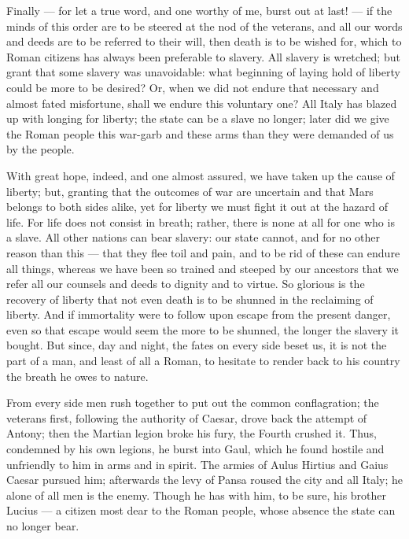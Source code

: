  Finally --- for let a true word, and one worthy of me, burst out at last! --- if the minds of this order are to be steered at the nod of the veterans, and all our words and deeds are to be referred to their will, then death is to be wished for, which to Roman citizens has always been preferable to slavery. All slavery is wretched; but grant that some slavery was unavoidable: what beginning of laying hold of liberty could be more to be desired? Or, when we did not endure that necessary and almost fated misfortune, shall we endure this voluntary one? All Italy has blazed up with longing for liberty; the state can be a slave no longer; later did we give the Roman people this war-garb and these arms than they were demanded of us by the people.

 With great hope, indeed, and one almost assured, we have taken up the cause of liberty; but, granting that the outcomes of war are uncertain and that Mars belongs to both sides alike, yet for liberty we must fight it out at the hazard of life. For life does not consist in breath; rather, there is none at all for one who is a slave. All other nations can bear slavery: our state cannot, and for no other reason than this --- that they flee toil and pain, and to be rid of these can endure all things, whereas we have been so trained and steeped by our ancestors that we refer all our counsels and deeds to dignity and to virtue. So glorious is the recovery of liberty that not even death is to be shunned in the reclaiming of liberty. And if immortality were to follow upon escape from the present danger, even so that escape would seem the more to be shunned, the longer the slavery it bought. But since, day and night, the fates on every side beset us, it is not the part of a man, and least of all a Roman, to hesitate to render back to his country the breath he owes to nature.

 From every side men rush together to put out the common conflagration; the veterans first, following the authority of Caesar, drove back the attempt of Antony; then the Martian legion broke his fury, the Fourth crushed it. Thus, condemned by his own legions, he burst into Gaul, which he found hostile and unfriendly to him in arms and in spirit. The armies of Aulus Hirtius and Gaius Caesar pursued him; afterwards the levy of Pansa roused the city and all Italy; he alone of all men is the enemy. Though he has with him, to be sure, his brother Lucius --- a citizen most dear to the Roman people, whose absence the state can no longer bear.

